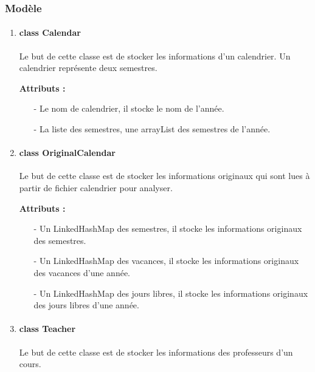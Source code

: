 \documentclass{polytech/polytech}
\begin{document}
	\subsubsection{Modèle}
		\begin{enumerate}
			\item \paragraph{class Calendar}

			Le but de cette classe est de stocker les informations d'un calendrier. Un calendrier représente deux semestres.

			\textbf{Attributs :}
				\begin{itemize}
					\item[-] Le nom de calendrier, il stocke le nom de l'année.
					\item[-] La liste des semestres, une arrayList des semestres de l'année.
				\end{itemize}

			\item \paragraph{class OriginalCalendar}

			Le but de cette classe est de stocker les informations originaux qui sont lues à partir de fichier calendrier pour analyser.

			\textbf{Attributs :}
				\begin{itemize}
					\item[-] Un LinkedHashMap des semestres, il stocke les informations originaux des semestres.
					\item[-] Un LinkedHashMap des vacances, il stocke les informations originaux des vacances d'une année.
					\item[-] Un LinkedHashMap des jours libres, il stocke les informations originaux des jours libres d'une année.
				\end{itemize}

			\item \paragraph{class Teacher}

			Le but de cette classe est de stocker les informations des professeurs d'un cours.


\end{enumerate}
\end{document}

